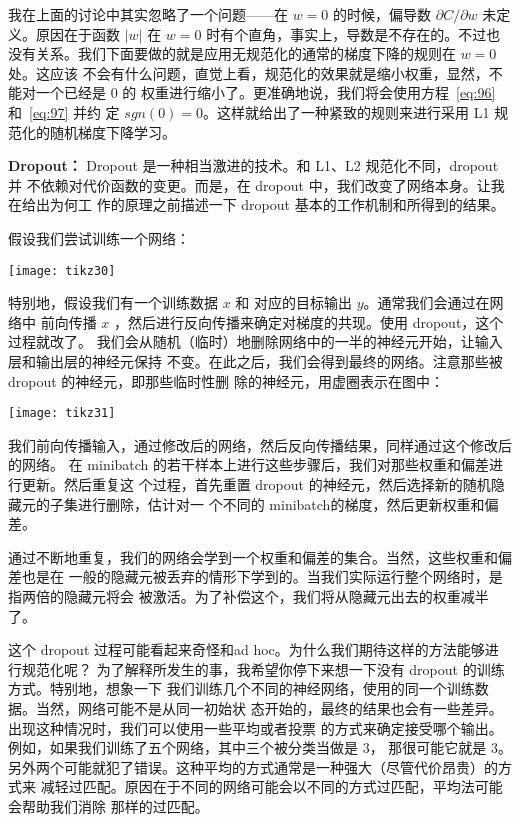 我在上面的讨论中其实忽略了一个问题——在 $w=0$ 的时候，偏导数 $\partial C/\partial
w$ 未定义。原因在于函数 $|w|$ 在 $w=0$ 时有个直角，事实上，导数是不存在的。不过也
没有关系。我们下面要做的就是应用无规范化的通常的梯度下降的规则在 $w=0$ 处。这应该
不会有什么问题，直觉上看，规范化的效果就是缩小权重，显然，不能对一个已经是 $0$ 的
权重进行缩小了。更准确地说，我们将会使用方程~\eqref{eq:96} 和~\eqref{eq:97} 并约
定 $sgn(0)=0$。这样就给出了一种紧致的规则来进行采用 L1 规范化的随机梯度下降学习。

\textbf{Dropout：} Dropout 是一种相当激进的技术。和 L1、L2 规范化不同，dropout 并
不依赖对代价函数的变更。而是，在 dropout 中，我们改变了网络本身。让我在给出为何工
作的原理之前描述一下 dropout 基本的工作机制和所得到的结果。

假设我们尝试训练一个网络：
\begin{center}
  \texttt{[image: tikz30]}
\end{center}

特别地，假设我们有一个训练数据 $x$ 和 对应的目标输出 $y$。通常我们会通过在网络中
前向传播 $x$ ，然后进行反向传播来确定对梯度的共现。使用 dropout，这个过程就改了。
我们会从随机（临时）地删除网络中的一半的神经元开始，让输入层和输出层的神经元保持
不变。在此之后，我们会得到最终的网络。注意那些被 dropout 的神经元，即那些临时性删
除的神经元，用虚圈表示在图中：
\begin{center}
  \texttt{[image: tikz31]}
\end{center}

我们前向传播输入，通过修改后的网络，然后反向传播结果，同样通过这个修改后的网络。
在 minibatch 的若干样本上进行这些步骤后，我们对那些权重和偏差进行更新。然后重复这
个过程，首先重置 dropout 的神经元，然后选择新的随机隐藏元的子集进行删除，估计对一
个不同的 minibatch的梯度，然后更新权重和偏差。

通过不断地重复，我们的网络会学到一个权重和偏差的集合。当然，这些权重和偏差也是在
一般的隐藏元被丢弃的情形下学到的。当我们实际运行整个网络时，是指两倍的隐藏元将会
被激活。为了补偿这个，我们将从隐藏元出去的权重减半了。

这个 dropout 过程可能看起来奇怪和ad hoc。为什么我们期待这样的方法能够进行规范化呢？
为了解释所发生的事，我希望你停下来想一下没有 dropout 的训练方式。特别地，想象一下
我们训练几个不同的神经网络，使用的同一个训练数据。当然，网络可能不是从同一初始状
态开始的，最终的结果也会有一些差异。出现这种情况时，我们可以使用一些平均或者投票
的方式来确定接受哪个输出。例如，如果我们训练了五个网络，其中三个被分类当做是 $3$，
那很可能它就是
$3$。另外两个可能就犯了错误。这种平均的方式通常是一种强大（尽管代价昂贵）的方式来
减轻过匹配。原因在于不同的网络可能会以不同的方式过匹配，平均法可能会帮助我们消除
那样的过匹配。

